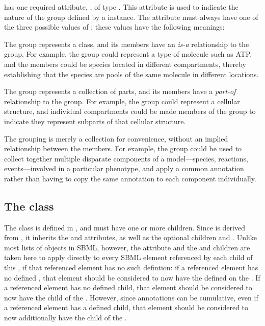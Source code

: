 \Group has one required attribute, , of type .  This attribute is used to indicate the nature of the group defined by a \Group instance.  The  attribute must always have one of the three possible values of ; these values have the following meanings:

\begin{description}[font=\normalfont\ttfamily\color{black},style=nextline]

\item[\token{classification}] The group represents a class, and its members have an \emph{is-a} relationship to the group.  For example, the group could represent a type of molecule such as ATP, and the members could be species located in different compartments, thereby establishing that the species are pools of the same molecule in different locations.

\item[\token{partonomy}] The group represents a collection of parts, and its members have a \emph{part-of} relationship to the group.  For example, the group could represent a cellular structure, and individual compartments could be made members of the group to indicate they represent subparts of that cellular structure.

\item[\token{collection}] The grouping is merely a collection for convenience, without an implied relationship between the members.  For example, the group could be used to collect together multiple disparate components of a model---species, reactions, events---involved in a particular phenotype, and apply a common annotation rather than having to copy the same annotation to each component individually.

\end{description}

\subsection{The  class}
\label{listofmembers-class}

The \ListOfMembers class is defined in , and must have one or more \Member children.  Since \ListOfMembers is derived from \SBase, it inherits the  and  attributes, as well as the optional children \Notes and \Annotation.  Unlike most lists of objects in SBML, however, the  attribute and the \Notes and \Annotation children are taken here to apply directly to every SBML element referenced by each child \Member of this \ListOfMembers, if that referenced element has no such defintion: if a referenced element has no defined , that element should be considered to now have the  defined on the \ListOfMembers.  If a referenced element has no defined \Notes child, that element should be considered to now have the \Notes child of the \ListOfMembers.  However, since annotations can be cumulative, even if a referenced element has a defined \Annotation child, that element should be considered to now additionally have the \Annotation child of the \ListOfMembers.

